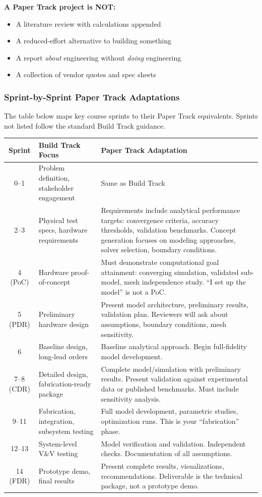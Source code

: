 \textbf{A Paper Track project is NOT:}
\begin{itemize}[nosep,leftmargin=1.5em]
\item A literature review with calculations appended
\item A reduced-effort alternative to building something
\item A report \emph{about} engineering without \emph{doing} engineering
\item A collection of vendor quotes and spec sheets
\end{itemize}

\subsubsection{Sprint-by-Sprint Paper Track Adaptations}

The table below maps key course sprints to their Paper Track equivalents. Sprints not listed follow the standard Build Track guidance.

{\centering\small
\begin{longtable}{c >{\raggedright\arraybackslash}p{5cm} >{\raggedright\arraybackslash}p{5.5cm}}
\toprule
\textbf{Sprint} & \textbf{Build Track Focus} & \textbf{Paper Track Adaptation} \\
\midrule
\endhead
0--1 & Problem definition, stakeholder engagement & Same as Build Track \\
2--3 & Physical test specs, hardware requirements & Requirements include analytical performance targets: convergence criteria, accuracy thresholds, validation benchmarks. Concept generation focuses on modeling approaches, solver selection, boundary conditions. \\
4 (PoC) & Hardware proof-of-concept & Must demonstrate computational goal attainment: converging simulation, validated sub-model, mesh independence study. ``I set up the model'' is not a PoC. \\
5 (PDR) & Preliminary hardware design & Present model architecture, preliminary results, validation plan. Reviewers will ask about assumptions, boundary conditions, mesh sensitivity. \\
6 & Baseline design, long-lead orders & Baseline analytical approach. Begin full-fidelity model development. \\
7--8 (CDR) & Detailed design, fabrication-ready package & Complete model/simulation with preliminary results. Present validation against experimental data or published benchmarks. Must include sensitivity analysis. \\
9--11 & Fabrication, integration, subsystem testing & Full model development, parametric studies, optimization runs. This is your ``fabrication'' phase. \\
12--13 & System-level V\&V testing & Model verification and validation. Independent checks. Documentation of all assumptions. \\
14 (FDR) & Prototype demo, final results & Present complete results, visualizations, recommendations. Deliverable is the technical package, not a prototype demo. \\
\bottomrule
\end{longtable}
}

